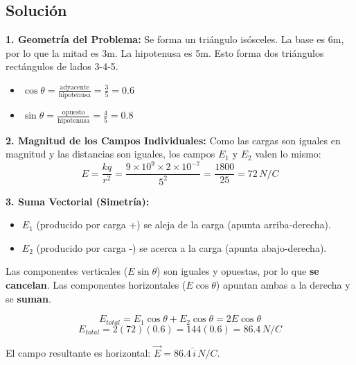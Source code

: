 \documentclass[12pt, a4paper]{article}
\begin{document}
\begin{center}
\end{center}

\subsection*{Solución}

\textbf{1. Geometría del Problema:}
Se forma un triángulo isósceles. La base es 6m, por lo que la mitad es 3m. La hipotenusa es 5m.
Esto forma dos triángulos rectángulos de lados 3-4-5.
\begin{itemize}
    \item $\cos\theta = \frac{\text{adyacente}}{\text{hipotenusa}} = \frac{3}{5} = 0.6$
    \item $\sin\theta = \frac{\text{opuesto}}{\text{hipotenusa}} = \frac{4}{5} = 0.8$
\end{itemize}

\textbf{2. Magnitud de los Campos Individuales:}
Como las cargas son iguales en magnitud y las distancias son iguales, los campos $E_1$ y $E_2$ valen lo mismo:
$$ E = \frac{k q}{r^2} = \frac{9 \times 10^9 \times 2 \times 10^{-7}}{5^2} = \frac{1800}{25} = 72 \, \si{N/C} $$

\textbf{3. Suma Vectorial (Simetría):}
\begin{itemize}
    \item $E_1$ (producido por carga +) se aleja de la carga (apunta arriba-derecha).
    \item $E_2$ (producido por carga -) se acerca a la carga (apunta abajo-derecha).
\end{itemize}
Las componentes verticales ($E \sin\theta$) son iguales y opuestas, por lo que \textbf{se cancelan}.
Las componentes horizontales ($E \cos\theta$) apuntan ambas a la derecha y se \textbf{suman}.

$$ E_{total} = E_1 \cos\theta + E_2 \cos\theta = 2 E \cos\theta $$
$$ E_{total} = 2 (72) (0.6) = 144 (0.6) = 86.4 \, \si{N/C} $$

\begin{tcolorbox}[colback=green!5!white,title=Respuesta]
El campo resultante es horizontal: $\vec{E} = 86.4 \, \hat{i} \, \si{N/C}$.
\end{tcolorbox}
\end{document}

